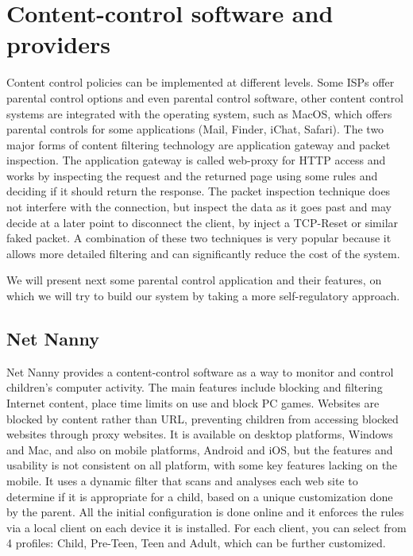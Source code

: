 
\chapter{Content-control software and providers} %

\label{Chapter2} %

Content control policies can be implemented at different levels. Some ISPs offer parental control options and even parental control software, other content control systems are integrated with the operating system, such as MacOS, which offers parental controls for some applications (Mail, Finder, iChat, Safari). The two major forms of content filtering technology are application gateway and packet inspection. The application gateway is called web-proxy for HTTP access and works by inspecting the request and the returned page using some rules and deciding if it should return the response. The packet inspection technique does not interfere with the connection, but inspect the data as it goes past and may decide at a later point to disconnect the client, by inject a TCP-Reset or similar faked packet. A combination of these two techniques is very popular because it allows more detailed filtering and can significantly reduce the cost of the system.

We will present next some parental control application and their features, on which we will try to build our system by taking a more self-regulatory approach.

\section{Net Nanny}

Net Nanny provides a content-control software as a way to monitor and control children's computer activity. The main features include blocking and filtering Internet content, place time limits on use and block PC games. Websites are blocked by content rather than URL, preventing children from accessing blocked websites through proxy websites. It is available on desktop platforms, Windows and Mac, and also on mobile platforms, Android and iOS, but the features and usability is not consistent on all platform, with some key features lacking on the mobile. It uses a dynamic filter that scans and analyses each web site to determine if it is appropriate for a child, based on a unique customization done by the parent. All the initial configuration is done online and it enforces the rules via a local client on each device it is installed. For each client, you can select from 4 profiles: Child, Pre-Teen, Teen and Adult, which can be further customized. \parencite{netNannyFeatures}


